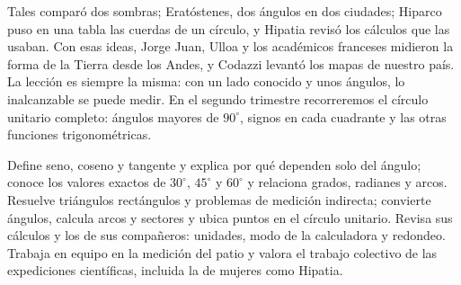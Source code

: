 \documentclass[11pt]{article}
\begin{document}

Tales comparó dos sombras; Eratóstenes, dos ángulos en dos ciudades; Hiparco
puso en una tabla las cuerdas de un círculo, y Hipatia revisó los cálculos que
las usaban. Con esas ideas, Jorge Juan, Ulloa y los académicos franceses
midieron la forma de la Tierra desde los Andes, y Codazzi levantó los mapas de
nuestro país. La lección es siempre la misma: con un lado conocido y unos
ángulos, lo inalcanzable se puede medir. En el segundo trimestre recorreremos
el círculo unitario completo: ángulos mayores de $90^\circ$, signos en cada
cuadrante y las otras funciones trigonométricas.

\matrizevaluacion
  {Define seno, coseno y tangente y explica por qué dependen solo del ángulo;
   conoce los valores exactos de $30^\circ$, $45^\circ$ y $60^\circ$ y relaciona grados,
   radianes y arcos.}
  {Resuelve triángulos rectángulos y problemas de medición indirecta; convierte
   ángulos, calcula arcos y sectores y ubica puntos en el círculo unitario.}
  {Revisa sus cálculos y los de sus compañeros: unidades, modo de la calculadora
   y redondeo.}
  {Trabaja en equipo en la medición del patio y valora el trabajo colectivo de
   las expediciones científicas, incluida la de mujeres como Hipatia.}

\autoevaluacion

\seguimientodocente
\end{document}
